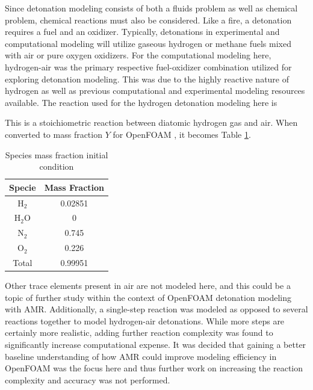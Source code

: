 Since detonation modeling consists of both a fluids problem as well as chemical problem, chemical reactions must also be considered. Like a fire, a detonation requires a fuel and an oxidizer. Typically, detonations in experimental and computational modeling will utilize gaseous hydrogen or methane fuels mixed with air or pure oxygen oxidizers. For the computational modeling here, hydrogen-air was the primary respective fuel-oxidizer combination utilized for exploring detonation modeling. This was due to the highly reactive nature of hydrogen as well as previous computational and experimental modeling resources available. The reaction used \cite{kuo} for the hydrogen detonation modeling here is
\begin{center}
\end{center}
This is a stoichiometric reaction between diatomic hydrogen gas and air. When converted to mass fraction \(Y\) for OpenFOAM \cite{marcantoni}, it becomes Table \ref{tab:y}.

\begin{table}[t!]
\centering
\caption{Species mass fraction initial condition}
\label{tab:y}
\begin{tabular}{cc}
Specie & Mass Fraction \\ \hline
H\(_2\) & 0.02851 \\ 
H\(_2\)O & 0 \\
N\(_2\) & 0.745 \\ 
O\(_2\) & 0.226 \\ 
Total & 0.99951 \\ 
\end{tabular}
\end{table}

Other trace elements present in air are not modeled here, and this could be a topic of further study within the context of OpenFOAM detonation modeling with AMR. Additionally, a single-step reaction was modeled as opposed to several reactions together to model hydrogen-air detonations. While more steps are certainly more realistic, adding further reaction complexity was found to significantly increase computational expense. It was decided that gaining a better baseline understanding of how AMR could improve modeling efficiency in OpenFOAM was the focus here and thus further work on increasing the reaction complexity and accuracy was not performed. 

